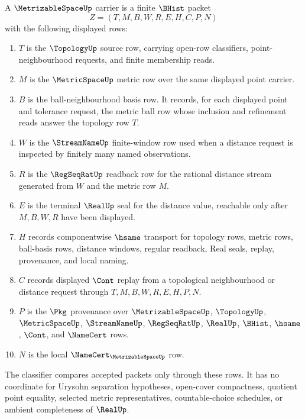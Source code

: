 \begin{definition}
\label{def:metrizable-space-carrier}
A $\MetrizableSpaceUp$ carrier is a finite $\BHist$ packet
$$
Z=(T,M,B,W,R,E,H,C,P,N)
$$
with the following displayed rows:
\begin{enumerate}
\item $T$ is the $\TopologyUp$ source row, carrying open-row classifiers, point-neighbourhood requests, and finite membership reads.
\item $M$ is the $\MetricSpaceUp$ metric row over the same displayed point carrier.
\item $B$ is the ball-neighbourhood basis row. It records, for each displayed point and tolerance request, the metric ball row whose inclusion and refinement reads answer the topology row $T$.
\item $W$ is the $\StreamNameUp$ finite-window row used when a distance request is inspected by finitely many named observations.
\item $R$ is the $\RegSeqRatUp$ readback row for the rational distance stream generated from $W$ and the metric row $M$.
\item $E$ is the terminal $\RealUp$ seal for the distance value, reachable only after $M,B,W,R$ have been displayed.
\item $H$ records componentwise $\hsame$ transport for topology rows, metric rows, ball-basis rows, distance windows, regular readback, Real seals, replay, provenance, and local naming.
\item $C$ records displayed $\Cont$ replay from a topological neighbourhood or distance request through $T,M,B,W,R,E,H,P,N$.
\item $P$ is the $\Pkg$ provenance over $\MetrizableSpaceUp$, $\TopologyUp$, $\MetricSpaceUp$, $\StreamNameUp$, $\RegSeqRatUp$, $\RealUp$, $\BHist$, $\hsame$, $\Cont$, and $\NameCert$ rows.
\item $N$ is the local $\NameCert_{\MetrizableSpaceUp}$ row.
\end{enumerate}
The classifier compares accepted packets only through these rows. It has no coordinate for Urysohn separation hypotheses, open-cover compactness, quotient point equality, selected metric representatives, countable-choice schedules, or ambient completeness of $\RealUp$.
\end{definition}

